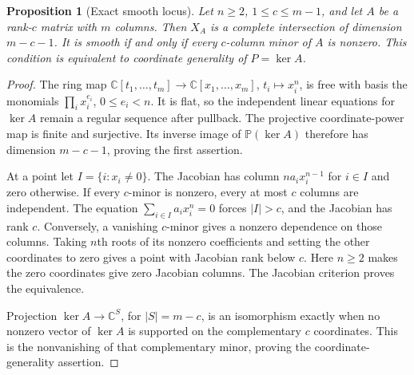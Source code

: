 \documentclass[11pt]{article}
\newcommand{\C}{\mathbb C}
\newcommand{\PP}{\mathbb P}
\theoremstyle{plain}
\newtheorem{proposition}[theorem]{Proposition}
\theoremstyle{definition}
\theoremstyle{remark}
\numberwithin{equation}{section}
\begin{document}
\begin{proposition}[Exact smooth locus]\label{prop:smooth-locus}
Let \(n\geq2\), \(1\leq c\leq m-1\), and let \(A\) be a rank-\(c\)
matrix with \(m\) columns.  Then \(X_A\) is a complete intersection
of dimension \(m-c-1\).  It is smooth if and only if every
\(c\)-column minor of \(A\) is nonzero.  This condition is equivalent
to coordinate generality of \(P=\ker A\).
\end{proposition}
\begin{proof}
The ring map \(\C[t_1,\ldots,t_m]\to\C[x_1,\ldots,x_m]\),
\(t_i\mapsto x_i^n\), is free with basis the monomials
\(\prod_i x_i^{e_i}\), \(0\leq e_i<n\).  It is flat, so the
independent linear equations for \(\ker A\) remain a regular
sequence after pullback.  The projective coordinate-power map is
finite and surjective.  Its inverse image of \(\PP(\ker A)\)
therefore has dimension \(m-c-1\), proving the first assertion.

At a point let \(I=\{i:x_i\ne0\}\).  The Jacobian has column
\(n a_i x_i^{n-1}\) for \(i\in I\) and zero otherwise.  If every
\(c\)-minor is nonzero, every at most \(c\) columns are independent.
The equation \(\sum_{i\in I}a_i x_i^n=0\) forces \(|I|>c\),
and the Jacobian has rank \(c\).  Conversely, a vanishing
\(c\)-minor gives a nonzero dependence on those columns.  Taking
\(n\)th roots of its nonzero coefficients and setting the other
coordinates to zero gives a point with Jacobian rank below \(c\).
Here \(n\geq2\) makes the zero coordinates give zero Jacobian
columns.  The Jacobian criterion proves the equivalence.

Projection \(\ker A\to\C^S\), for \(|S|=m-c\), is an isomorphism
exactly when no nonzero vector of \(\ker A\) is supported on the
complementary \(c\) coordinates.  This is the nonvanishing of that
complementary minor, proving the coordinate-generality assertion.
\end{proof}
\end{document}

